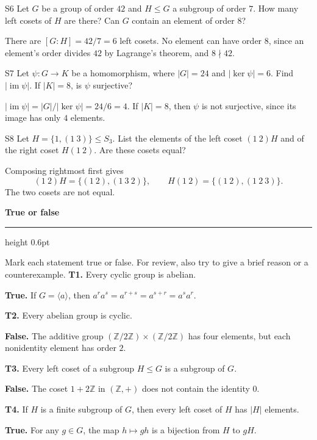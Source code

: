 \documentclass[11pt]{article}
\newcommand{\chapterheading}[1]{%
  \par\vspace{0.5em}
  {\color{courseblue}\Large\bfseries #1}\par\vspace{0.35em}
  {\color{boxborder}\hrule height 0.6pt}\vspace{0.35em}
}
\begin{document}
\begin{exercise}{S6}
Let $G$ be a group of order $42$ and $H\leq G$ a subgroup of order $7$.
How many left cosets of $H$ are there? Can $G$ contain an element of order $8$?
\end{exercise}
\begin{solution}
There are $[G:H]=42/7=6$ left cosets. No element can have order $8$,
since an element's order divides $42$ by Lagrange's theorem, and $8\nmid42$.
\end{solution}
\begin{exercise}{S7}
Let $\psi:G\to K$ be a homomorphism, where $|G|=24$ and
$|\ker\psi|=6$. Find $|\operatorname{im}\psi|$.
If $|K|=8$, is $\psi$ surjective?
\end{exercise}
\begin{solution}
$|\operatorname{im}\psi|=|G|/|\ker\psi|=24/6=4$.
If $|K|=8$, then $\psi$ is not surjective, since its image has only $4$ elements.
\end{solution}
\begin{exercise}{S8}
Let $H=\{1,(1\ 3)\}\leq S_3$.
List the elements of the left coset $(1\ 2)H$ and of the right coset
$H(1\ 2)$. Are these cosets equal?
\end{exercise}
\begin{solution}
Composing rightmost first gives
\[
(1\ 2)H=\{(1\ 2),(1\ 3\ 2)\},\qquad
H(1\ 2)=\{(1\ 2),(1\ 2\ 3)\}.
\]
The two cosets are not equal.
\end{solution}
\newpage
\chapterheading{True or false}
Mark each statement true or false. For review, also try to give a brief reason or a counterexample.
\textbf{T1.} Every cyclic group is abelian.
\begin{solution}
\textbf{True.} If $G=\langle a\rangle$, then $a^ra^s=a^{r+s}=a^{s+r}=a^sa^r$.
\end{solution}
\textbf{T2.} Every abelian group is cyclic.
\begin{solution}
\textbf{False.} The additive group $(\mathbb Z/2\mathbb Z)\times(\mathbb Z/2\mathbb Z)$ has four elements, but each nonidentity element has order $2$.
\end{solution}
\textbf{T3.} Every left coset of a subgroup $H\leq G$ is a subgroup of $G$.
\begin{solution}
\textbf{False.} The coset $1+2\mathbb Z$ in $(\mathbb Z,+)$ does not contain the identity $0$.
\end{solution}
\textbf{T4.} If $H$ is a finite subgroup of $G$, then every left coset of $H$ has $|H|$ elements.
\begin{solution}
\textbf{True.} For any $g\in G$, the map $h\mapsto gh$ is a bijection from $H$ to $gH$.
\end{solution}
\end{document}
